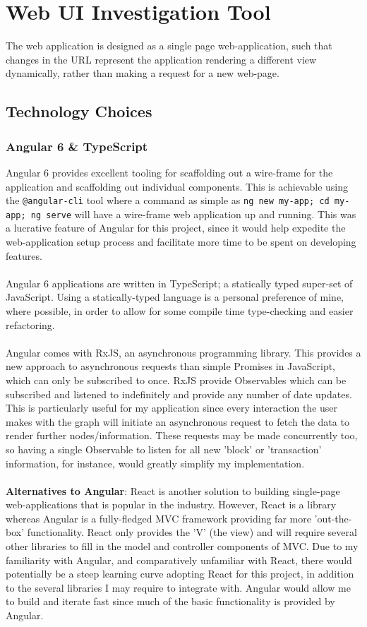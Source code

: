 \section{Web UI Investigation Tool}

The web application is designed as a single page web-application, such that changes in the URL represent the application rendering a different view dynamically, rather than making a request for a new web-page. 

\subsection{Technology Choices}
\subsubsection{Angular 6 \& TypeScript}
Angular 6 provides excellent tooling for scaffolding out a wire-frame for the application and scaffolding out individual components. This is achievable using the \texttt{@angular-cli} tool where a command as simple as \texttt{ng new my-app; cd my-app; ng serve} will have a wire-frame web application up and running. This was a lucrative feature of Angular for this project, since it would help expedite the web-application setup process and facilitate more time to be spent on developing features.
\\\\
Angular 6 applications are written in TypeScript; a statically typed super-set of JavaScript. Using a statically-typed language is a personal preference of mine, where possible, in order to allow for some compile time type-checking and easier refactoring. 
\\\\
Angular comes with RxJS, an asynchronous programming library. This provides a new approach to asynchronous requests than simple Promises in JavaScript, which can only be subscribed to once. RxJS provide Observables which can be subscribed and listened to indefinitely and provide any number of date updates. This is particularly useful for my application since every interaction the user makes with the graph will initiate an asynchronous request to fetch the data to render further nodes/information. These requests may be made concurrently too, so having a single Observable to listen for all new 'block' or 'transaction' information, for instance, would greatly simplify my implementation. 
\\\\
\textbf{Alternatives to Angular}: React is another solution to building single-page web-applications that is popular in the industry. However, React is a library whereas Angular is a fully-fledged MVC framework providing far more 'out-the-box' functionality. React only provides the 'V' (the view) and will require several other libraries to fill in the model and controller components of MVC. Due to my familiarity with Angular, and comparatively unfamiliar with React, there would potentially be a steep learning curve adopting React for this project, in addition to the several libraries I may require to integrate with. Angular would allow me to build and iterate fast since much of the basic functionality is provided by Angular.

